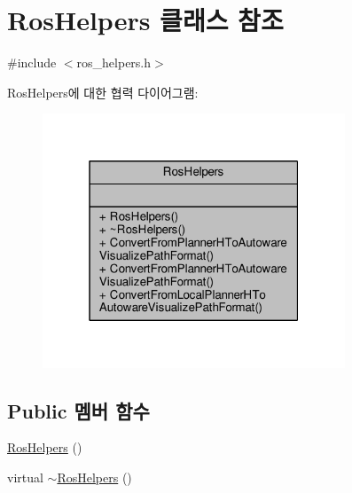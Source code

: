 \hypertarget{class_ros_helpers}{}\section{Ros\+Helpers 클래스 참조}
\label{class_ros_helpers}


{\ttfamily \#include $<$ros\+\_\+helpers.\+h$>$}



Ros\+Helpers에 대한 협력 다이어그램\+:\nopagebreak
\begin{figure}[H]
\begin{center}
\leavevmode
\includegraphics[width=256pt]{class_ros_helpers__coll__graph}
\end{center}
\end{figure}
\subsection*{Public 멤버 함수}
\begin{DoxyCompactItemize}
\item 
\hyperlink{class_ros_helpers_aee54c7b32e2c62ccc73e00f96a392f6f}{Ros\+Helpers} ()
\item 
virtual \hyperlink{class_ros_helpers_a8ffdfbb8effbdbbc162e5e3168faba84}{$\sim$\+Ros\+Helpers} ()
\end{DoxyCompactItemize}
